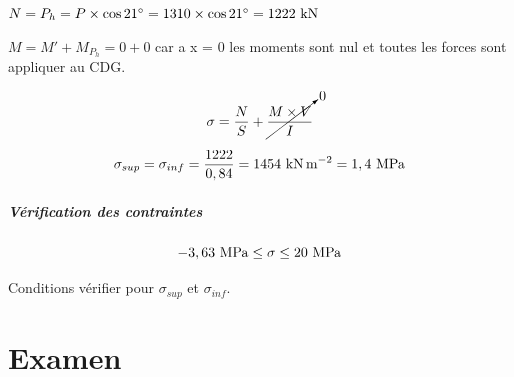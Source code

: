 \documentclass[12pt,a4paper]{article}
\newcommand{\sgma}[1]{\sigma_{#1}}
\begin{document}
	$N = P_{h} = P \times \cos21\degree = 1310 \times \cos21\degree = 1222\kn $
	
	$M = M' + M_{P_{h}} = 0 + 0$ car a x = 0 les moments sont nul et toutes les forces sont appliquer au CDG.
	
	
	\[ \sigma = \dfrac{N}{S} + \cancelto{0}{\dfrac{M \times V}{I}} \]
	
	
	\[ \sgma{sup} = \sgma{inf} = \dfrac{1222}{0,84} = 1454\knms = 1,4\mpa \]
	
	\subsubsection{Vérification des contraintes}
	
	\[ -3,63\mpa \leq \sigma \leq 20\mpa \]
	
	Conditions vérifier pour $\sgma{sup}$ et $\sgma{inf}$.
	
	
	
	\newpage
	
	
	\part{Examen}
	
	
	
	\begin{center}
		
		
		
		
	\end{center}
	
\end{document}
